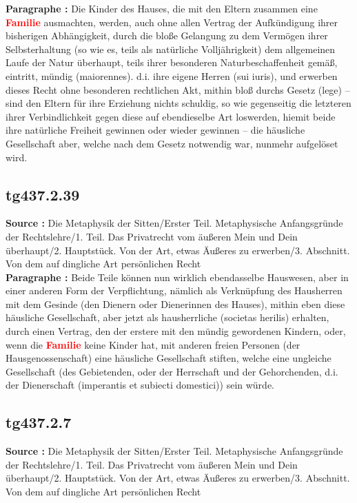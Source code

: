 \documentclass[a4paper,12pt,twoside]{book}
\newcommand{\match}[1]{\textcolor{red}{\textbf{#1}}}
\begin{document}
	\textbf{Paragraphe : }Die Kinder des Hauses, die mit den Eltern zusammen eine \match{Familie} ausmachten, werden, auch ohne allen Vertrag  der Aufkündigung ihrer bisherigen Abhängigkeit, durch die bloße Gelangung zu dem Vermögen ihrer Selbsterhaltung (so wie es, teils als natürliche Volljährigkeit) dem allgemeinen Laufe der Natur überhaupt, teils ihrer besonderen Naturbeschaffenheit gemäß, eintritt, mündig (maiorennes). d.i. ihre eigene Herren (sui iuris), und erwerben dieses Recht ohne besonderen rechtlichen Akt, mithin bloß durchs Gesetz (lege) – sind den Eltern für ihre Erziehung nichts schuldig, so wie gegenseitig die letzteren ihrer Verbindlichkeit gegen diese auf ebendieselbe Art loswerden, hiemit beide ihre natürliche Freiheit gewinnen oder wieder gewinnen – die häusliche Gesellschaft aber, welche nach dem Gesetz notwendig war, nunmehr aufgelöset wird. 
	
	\subsection*{tg437.2.39} 
	\textbf{Source : }Die Metaphysik der Sitten/Erster Teil. Metaphysische Anfangsgründe der Rechtslehre/1. Teil. Das Privatrecht vom äußeren Mein und Dein überhaupt/2. Hauptstück. Von der Art, etwas Äußeres zu erwerben/3. Abschnitt. Von dem auf dingliche Art persönlichen Recht\\  
	
	\textbf{Paragraphe : }Beide Teile können nun wirklich ebendasselbe Hauswesen, aber in einer anderen Form der Verpflichtung, nämlich als Verknüpfung des Hausherren mit dem Gesinde (den Dienern oder Dienerinnen des Hauses), mithin eben diese häusliche Gesellschaft, aber jetzt als hausherrliche (societas herilis) erhalten, durch einen Vertrag, den der erstere mit den mündig gewordenen Kindern, oder, wenn die \match{Familie} keine Kinder hat, mit anderen freien Personen (der Hausgenossenschaft) eine häusliche Gesellschaft stiften, welche eine ungleiche Gesellschaft (des Gebietenden, oder der Herrschaft und der Gehorchenden, d.i. der Dienerschaft (imperantis et subiecti domestici)) sein würde. 
	
	\subsection*{tg437.2.7} 
	\textbf{Source : }Die Metaphysik der Sitten/Erster Teil. Metaphysische Anfangsgründe der Rechtslehre/1. Teil. Das Privatrecht vom äußeren Mein und Dein überhaupt/2. Hauptstück. Von der Art, etwas Äußeres zu erwerben/3. Abschnitt. Von dem auf dingliche Art persönlichen Recht\\  
	
\end{document}
